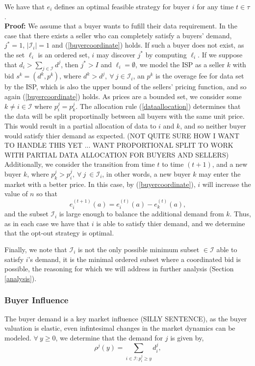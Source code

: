 \documentclass[12pt]{article}
\theoremstyle{definition}
\newcommand{\mcI}{\mathcal{I}}
\begin{document}
\begin{multicols}{2}
{We have that $e_i$ defines an optimal feasible strategy for buyer $i$ for any
time $t\in\tau$.
}\\
\textbf{Proof:}
We assume that a buyer wants to fufill their data requirement.
In the case that there exists a seller who can completely satisfy a buyers'
demand, $j^*=1$, $\vert \mcI_i\vert =1$ and (\ref{buyercoordinate}) holds. If such a buyer does not exist,
as the set $\ell_i$ is an ordered set, $i$ may discover 
$j^*$ by computing $\ell_i$. If we suppose that $d_i >
\sum_{j\in\mcI}d^j$, then $j^* > I$ and $\ell_i = \emptyset$, 
we model the ISP as a seller $k$ with bid $s^k =(d^k, p^k)$, where $d^k > d^j, \
\forall \ j\in\mcI_i$, an
$p^k$ is the overage fee for data set by the ISP, which is also the upper bound of the sellers'
pricing function, and so again (\ref{buyercoordinate}) holds.
As prices are a bounded set, we consider some $k \ne i \in
\mcI$ where $p_i^j = p_k^j$. 
The allocation rule (\ref{dataallocation}) determines that the data will be split proportinally
between all buyers with the same unit price. 
This would result in a partial allocation of data to $i$ and $k$, and so neither
buyer would satisfy thier demand as expected. (NOT QUITE SURE
HOW I WANT TO HANDLE THIS YET ... WANT PROPORTIONAL SPLIT TO WORK WITH PARTIAL
DATA ALLOCATION FOR BUYERS AND SELLERS)
Additionally, we consider the transition from time $t$ to time $(t+1)$, and a
new buyer $k$, where $p_k^j > p_i^j, \ \forall \ j \ \in \mcI_i$, in other words, a new buyer $k$ may enter the market with a better
price. In this case, by (\ref{buyercoordinate}), $i$ will increase the value of
$n$ so that
$$
    e_i^{(t+1)}(a) = e_i^{(t)}(a) - e_k^{(t)}(a),
$$
and the subset $\mcI_i$ is large enough to balance the additional demand from
$k$. Thus, as in each case we have that $i$ is able to satisfy thier demand,
and we determine that the opt-out strategy is optimal.

Finally, we note that $\mcI_i$ is not the only
possible minimum subset $\in\mcI$ able to satisfy $i$'s demand, it is the
minimal ordered subset where a
coordinated bid is possible, the reasoning for which we will address in further analysis (Section
\ref{analysis}). 

\subsubsection{Buyer Influence}
The buyer demand is a key market influence (SILLY SENTENCE), as the buyer
valuation is elastic, even infintesimal changes in the market dynamics can be
modeled. $\forall \ y\ge 0$, we determine that the demand for $j$ is given by,
\begin{equation}\label{datademand}
    \rho^j(y) = \sum_{i\in\mcI : p_i^j\ge y} d_i^j, 
\end{equation}


\end{multicols}
\end{document}
